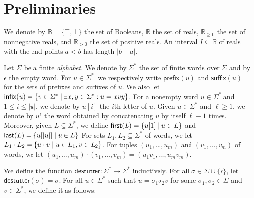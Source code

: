 \documentclass[iicol,lineno]{sn-jnl}
\renewcommand{\pfx}{\textsf{prefix}}
\newcommand{\first}{\textsf{first}}
\newcommand{\last}{\textsf{last}}
\renewcommand{\sfx}{\textsf{suffix}}
\newcommand{\infx}{\textsf{infix}}
\newcommand{\destutter}{\mathsf{destutter}}
\newcommand{\R}{\mathbb{R}}
\newcommand{\B}{\mathbb{B}}
\newcommand{\?}{\text{?}}
\newcommand{\suchthat}{\;\ifnum\currentgrouptype=16 \middle\fi|\;}
\let\st\suchthat
\begin{document}
	
	\section{Preliminaries} \label{sec:preliminaries}
	
	We denote by $\B = \{ \top, \bot \}$ the set of Booleans, $\R$ the set of reals, $\R_{\geq 0}$ the set of nonnegative reals, and $\R_{> 0}$ the 
	set of positive reals.
	An interval $I \subseteq \R$ of reals with the end points $a < b$ has length $|b-a|$.
	
	Let $\Sigma$ be a finite {\em alphabet}.
	We denote by $\Sigma^*$ the set of finite words over $\Sigma$ and by $\epsilon$ the empty word.
	For $u \in \Sigma^*$, we respectively write $\pfx(u)$ and $\sfx(u)$ for the sets of prefixes 
	and suffixes of $u$.
	We also let $\infx(u) = \{v \in \Sigma^* \st \exists x,y \in \Sigma^* : u = xvy\}$.
	For a nonempty word $u \in \Sigma^*$ and $1 \leq i \leq |u|$, we denote by $u[i]$ the $i$th letter of $u$.
	Given $u \in \Sigma^*$ and $\ell \geq 1$, we denote by $u^\ell$ the word obtained by concatenating $u$ by itself $\ell - 1$ times.
	Moreover, given $L \subseteq \Sigma^*$, we define $\first(L) = \{ u[1] \st u \in L\}$ and $\last(L) = \{ u[|u|] \st u \in L\}$
	For sets $L_1, L_2 \subseteq \Sigma^*$ of words, we let $L_1 \cdot L_2 = \{u \cdot v \st u \in L_1, v \in L_2\}$.
	For tuples $(u_1, \ldots, u_m)$ and $(v_1, \ldots, v_m)$ of words, we let $(u_1, \ldots, u_m) \cdot (v_1, \ldots, v_m) = (u_1 v_1, \ldots, u_m v_m)$.
	
	We define the function $\destutter : \Sigma^* \to \Sigma^*$ inductively.
	For all $\sigma \in \Sigma \cup \{\epsilon\}$, let $\destutter(\sigma) = \sigma$.
	For all $u \in \Sigma^*$ such that $u = \sigma_1 \sigma_2 v$ for some $\sigma_1,\sigma_2 \in 
	\Sigma$ and $v \in \Sigma^*$, we define it as follows:
	
\end{document}
